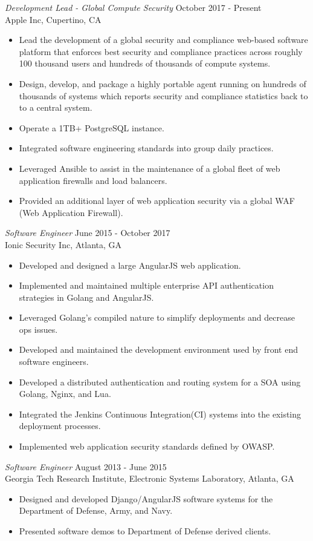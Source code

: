 \documentclass[margin, 10pt]{res} %
\begin{document}
\begin{resume}
{\sl Development Lead - Global Compute Security} \hfill October 2017 - Present \\
Apple Inc, Cupertino, CA
\begin{itemize}
\item Lead the development of a global security and compliance web-based software platform that enforces best security and compliance practices across roughly 100 thousand users and hundreds of thousands of compute systems.
\item Design, develop, and package a highly portable agent running on hundreds of thousands of systems which reports security and compliance statistics back to to a central system.
\item Operate a 1TB+ PostgreSQL instance.
\item Integrated software engineering standards into group daily practices.
\item Leveraged Ansible to assist in the maintenance of a global fleet of web application firewalls and load balancers.
\item Provided an additional layer of web application security via a global WAF (Web Application Firewall).
\end{itemize} 

{\sl Software Engineer} \hfill June 2015 - October 2017 \\
Ionic Security Inc, Atlanta, GA
\begin{itemize}
\item Developed and designed a large AngularJS web application.
\item Implemented and maintained multiple enterprise API authentication strategies in Golang and AngularJS.
\item Leveraged Golang's compiled nature to simplify deployments and decrease ops issues.
\item Developed and maintained the development environment used by front end software engineers.
\item Developed a distributed authentication and routing system for a SOA using Golang, Nginx, and Lua.
\item Integrated the Jenkins Continuous Integration(CI) systems into the existing deployment processes.
\item Implemented web application security standards defined by OWASP.
\end{itemize} 

{\sl Software Engineer} \hfill August 2013 - June 2015 \\
Georgia Tech Research Institute, Electronic Systems Laboratory, Atlanta, GA 
\begin{itemize} \itemsep -2pt %
\item Designed and developed Django/AngularJS software systems for the Department of Defense, Army, and Navy.
\item Presented software demos to Department of Defense derived clients.
\end{itemize}
 

\end{resume}
\end{document}
